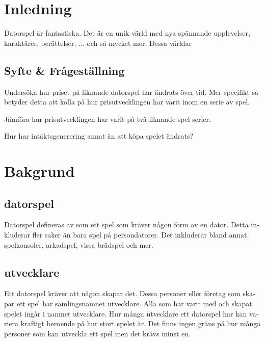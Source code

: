\documentclass[11p]{article}
\begin{document}
    \begin{otherlanguage}{swedish}
    \tableofcontents

    \newpage

\setlength{\parskip}{10pt}

\section{Inledning}
    Datorspel är fantastiska.
    Det är en unik värld med nya spännande upplevelser, karaktärer, berättelser, ... och så mycket mer.
    Dessa världar



\subsection{Syfte & Frågeställning}
    Undersöka hur priset på liknande datorspel har ändrats över tid.
    Mer specifikt så betyder detta att kolla på hur prisutvecklingen har varit inom en serie av spel.

    Jämföra hur prisutvecklingen har varit på två liknande spel serier.

    Hur har intäktsgenerering annat än att köpa spelet ändrats?

\section{Bakgrund}

    \subsection{datorspel}
    Datorspel defineras av \textcite{ComputerSweden} som ett spel som kräver någon form av en dator.
    Detta inkluderar fler saker än bara spel på persondatorer.
    Det inkluderar bland annat spelkonsoler, arkadspel, vissa brädspel och mer.

    \subsection{utvecklare}
    Ett datorspel kräver att någon skapar det.
    Dessa personer eller företag som skapar ett spel har samlingsnamnet utvecklare.
    Alla som har varit med och skapat spelet ingår i namnet utvecklare.
    Hur många utvecklare ett datorspel har kan variera kraftigt beroende på hur stort spelet är.
    Det finns ingen gräns på hur många personer som kan utveckla ett spel men det krävs minst en.


\end{otherlanguage}
\end{document}
